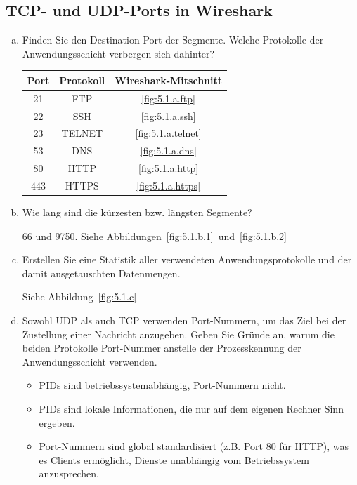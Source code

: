 \setcounter{section}{5}
\setcounter{subsection}{0}
\subsection{TCP- und UDP-Ports in Wireshark}

\begin{enumerate}[(a)]
    \item Finden Sie den Destination-Port der Segmente. Welche Protokolle der
        Anwendungsschicht verbergen sich dahinter?

        \begin{table}[h]
            \centering
            \begin{tabular}{c|c|c}
                Port & Protokoll & Wireshark-Mitschnitt \\
                \hline
                21   & FTP       & \ref{fig:5.1.a.ftp} \\
                22   & SSH       & \ref{fig:5.1.a.ssh} \\
                23   & TELNET    & \ref{fig:5.1.a.telnet} \\
                53   & DNS       & \ref{fig:5.1.a.dns} \\
                80   & HTTP      & \ref{fig:5.1.a.http} \\
                443  & HTTPS     & \ref{fig:5.1.a.https}
            \end{tabular}
        \end{table}

    \item Wie lang sind die kürzesten bzw. längsten Segmente?

        66 und 9750. Siehe Abbildungen~\ref{fig:5.1.b.1}~und~\ref{fig:5.1.b.2}

    \item Erstellen Sie eine Statistik aller verwendeten Anwendungsprotokolle
        und der damit ausgetauschten Datenmengen.

        Siehe Abbildung~\ref{fig:5.1.c}

    \item Sowohl UDP als auch TCP verwenden Port-Nummern, um das Ziel bei der
        Zustellung einer Nachricht anzugeben. Geben Sie Gründe an, warum die
        beiden Protokolle Port-Nummer anstelle der Prozesskennung der
        Anwendungsschicht verwenden.

        \begin{itemize}
            \item PIDs sind betriebssystemabhängig, Port-Nummern nicht. 
            \item PIDs sind lokale Informationen, die nur auf dem eigenen
                Rechner Sinn ergeben.
            \item Port-Nummern sind global standardisiert (z.B. Port 80 für
                HTTP), was es Clients ermöglicht, Dienste unabhängig vom
                Betriebssystem anzusprechen.
        \end{itemize}
\end{enumerate}

